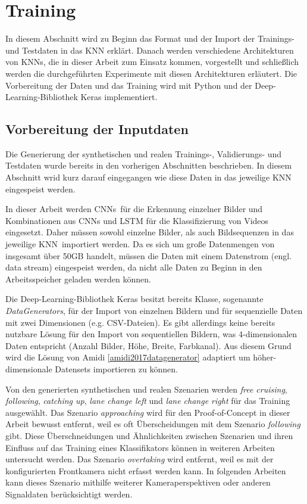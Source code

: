 \section{Training}
\label{umsetzung_training}

In diesem Abschnitt wird zu Beginn das Format und der Import der Trainings- und Testdaten in das \ac{KNN} erklärt. Danach werden verschiedene Architekturen von \acp{KNN}, die in dieser Arbeit zum Einsatz kommen, vorgestellt und schließlich werden die durchgeführten Experimente mit diesen Architekturen erläutert. Die Vorbereitung der Daten und das Training wird mit Python und der Deep-Learning-Bibliothek Keras \cite{chollet2015keras} implementiert.


\subsection{Vorbereitung der Inputdaten}
\label{umsetzung_training_input}

Die Generierung der synthetischen und realen Trainings-, Validierungs- und Testdaten wurde bereits in den vorherigen Abschnitten beschrieben. In diesem Abschnitt wrid kurz darauf eingegangen wie diese Daten in das jeweilige \ac{KNN} eingespeist werden.

In dieser Arbeit werden \acp{CNN} für die Erkennung einzelner Bilder und Kombinationen aus \acp{CNN} und \ac{LSTM} für die Klassifizierung von Videos eingesetzt. Daher müssen sowohl einzelne Bilder, als auch Bildsequenzen in das jeweilige \ac{KNN} importiert werden. Da es sich um große Datenmengen von insgesamt über 50GB handelt, müssen die Daten mit einem Datenstrom (engl. data stream) eingespeist werden, da nicht alle Daten zu Beginn in den Arbeitsspeicher geladen werden können.

Die Deep-Learning-Bibliothek Keras besitzt bereits Klasse, sogenannte \textit{DataGenerators}, für der Import von einzelnen Bildern und für sequenzielle Daten mit zwei Dimensionen (e.g. CSV-Dateien). Es gibt allerdings keine bereits nutzbare Lösung für den Import von sequentiellen Bildern, was 4-dimensionalen Daten entspricht (Anzahl Bilder, Höhe, Breite, Farbkanal). Aus diesem Grund wird die Lösung von Amidi \ref{amidi2017datagenerator} adaptiert um höher-dimensionale Datensets importieren zu können.

Von den generierten synthetischen und realen Szenarien werden \textit{free cruising}, \textit{following}, \textit{catching up}, \textit{lane change left} und \textit{lane change right} für das Training ausgewählt. Das Szenario \textit{approaching} wird für den Proof-of-Concept in dieser Arbeit bewusst entfernt, weil es oft Überscheidungen mit dem Szenario \textit{following} gibt. Diese Überschneidungen und Ähnlichkeiten zwischen Szenarien und ihren Einfluss auf das Training eines Klassifikators können in weiteren Arbeiten untersucht werden. Das Szenario \textit{overtaking} wird entfernt, weil es mit der konfigurierten Frontkamera nicht erfasst werden kann. In folgenden Arbeiten kann dieses Szenario mithilfe weiterer Kameraperspektiven oder anderen Signaldaten berücksichtigt werden.

